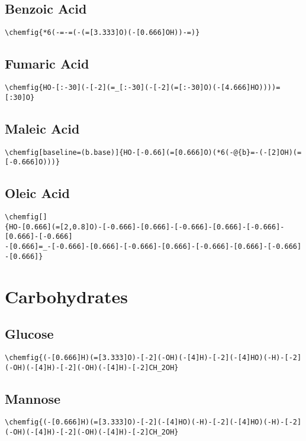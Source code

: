 \section{Benzoic Acid}\label{app:benzoic-acid}
\begin{lstlisting}
\chemfig{*6(-=-=(-(=[3.333]O)(-[0.666]OH))-=)}
\end{lstlisting}


\section{Fumaric Acid}\label{app:fumaric-acid}
\begin{lstlisting}
\chemfig{HO-[:-30](-[-2](=_[:-30](-[-2](=[:-30]O)(-[4.666]HO))))=[:30]O}
\end{lstlisting}


\section{Maleic Acid}\label{app:maleic-acid}
\begin{lstlisting}
\chemfig[baseline=(b.base)]{HO-[-0.66](=[0.666]O)(*6(-@{b}=-(-[2]OH)(=[-0.666]O)))}
\end{lstlisting}


\section{Oleic Acid}\label{app:oleic-acid}
\begin{lstlisting}
\chemfig[]
{HO-[0.666](=[2,0.8]O)-[-0.666]-[0.666]-[-0.666]-[0.666]-[-0.666]-[0.666]-[-0.666]
-[0.666]=_-[-0.666]-[0.666]-[-0.666]-[0.666]-[-0.666]-[0.666]-[-0.666]
-[0.666]}
\end{lstlisting}



\chapter{Carbohydrates}\label{app:carbohydrates}
\section{Glucose}\label{app:glucose}
\begin{lstlisting}
\chemfig{(-[0.666]H)(=[3.333]O)-[-2](-OH)(-[4]H)-[-2](-[4]HO)(-H)-[-2](-OH)(-[4]H)-[-2](-OH)(-[4]H)-[-2]CH_2OH}
\end{lstlisting}

\section{Mannose}\label{app:mannose}
\begin{lstlisting}
\chemfig{(-[0.666]H)(=[3.333]O)-[-2](-[4]HO)(-H)-[-2](-[4]HO)(-H)-[-2](-OH)(-[4]H)-[-2](-OH)(-[4]H)-[-2]CH_2OH}
\end{lstlisting}

